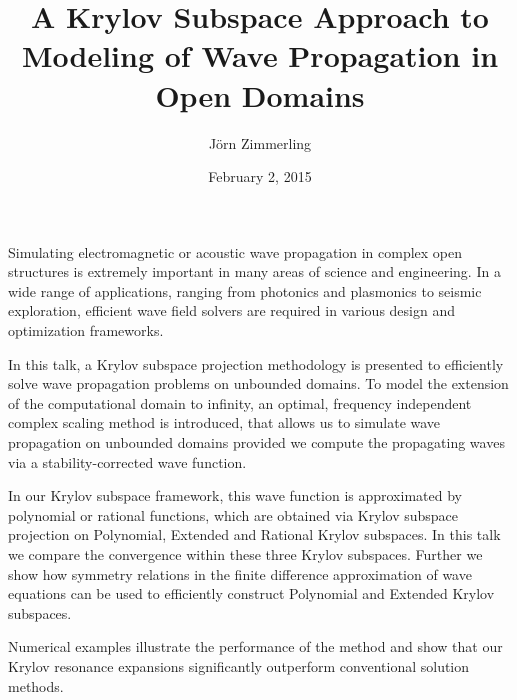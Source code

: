 \documentclass{article}
\title{A Krylov Subspace Approach to Modeling of Wave Propagation in Open Domains}
\author{J\"orn Zimmerling}
\affil{PhD student at TU Delft}
\date{February 2, 2015}
\begin{document}
\maketitle

Simulating electromagnetic or acoustic wave propagation in complex open structures is extremely important in many areas of science and engineering. In a wide range of applications, ranging from photonics and plasmonics to seismic exploration, efficient wave field solvers are required in various design and optimization frameworks.  
 
In this talk, a Krylov subspace projection methodology is presented to efficiently solve wave propagation problems on unbounded domains. To model the extension of the computational domain to infinity, an optimal, frequency independent complex scaling method is introduced, that allows us to simulate wave propagation on unbounded domains provided we compute the propagating waves via a stability-corrected wave function.

In our Krylov subspace framework, this wave function is approximated by polynomial or rational functions, which are obtained via Krylov subspace projection on Polynomial, Extended and Rational Krylov subspaces. In this talk we compare the convergence within these three Krylov subspaces. Further we show how symmetry relations in the finite difference approximation of wave equations can be used to efficiently construct Polynomial and Extended Krylov subspaces. 

Numerical examples illustrate the performance of the method and show that our Krylov resonance expansions significantly outperform conventional solution methods.
\end{document}
